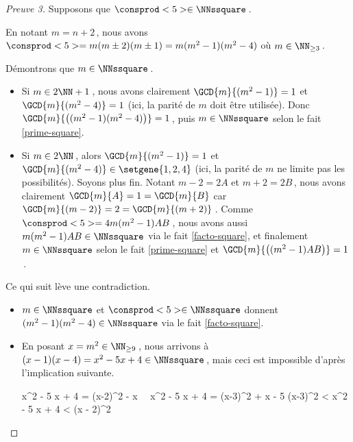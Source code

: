 \begin{proof}[Preuve 3]
	Supposons que $\consprod<5> \in \NNssquare$\,.
    
    \smallskip
    
	En notant $m = n+2$\,, nous avons $\consprod<5> = m (m \pm 2) (m \pm 1) = m (m^2 - 1) (m^2 - 4)$ où $m \in \NN_{\geq 3}$\,.
    
    \medskip
    
    Démontrons que $m \in \NNssquare$\,.
	\begin{itemize}
		\item Si $m \in 2 \NN + 1$\,, nous avons clairement $\GCD{m}{(m^2 - 1)} = 1$ et $\GCD{m}{(m^2 - 4)} = 1$ (ici, la parité de $m$ doit être utilisée).
		Donc $\GCD{m}{\big( (m^2 - 1) (m^2 - 4) \big)} = 1$\,, puis $m \in \NNssquare$ selon le fait \ref{prime-square}.

		\item Si $m \in 2 \NN$\,, alors $\GCD{m}{(m^2 - 1)} = 1$ et $\GCD{m}{(m^2 - 4)} \in \setgene{1, 2, 4}$ (ici, la parité de $m$ ne limite pas les possibilités). Soyons plus fin.
		Notant $m - 2 = 2A$ et $m + 2 = 2B$\,, nous avons clairement $\GCD{m}{A} = 1 = \GCD{m}{B}$ car $\GCD{m}{(m - 2)} = 2 = \GCD{m}{(m + 2)}$\,.
		Comme $\consprod<5> = 4 m (m^2 - 1) A B$\,, nous avons aussi $m (m^2 - 1) A B \in \NNssquare$ via le fait \ref{facto-square}, et finalement $m \in \NNssquare$ selon le fait \ref{prime-square} et $\GCD{m}{\big( (m^2 - 1) A B \big)} = 1$\,. 
	\end{itemize}
    
    \medskip
    
    Ce qui suit lève une contradiction.
	\begin{itemize}
		\item $m \in \NNssquare$ et $\consprod<5> \in \NNssquare$ donnent $(m^2 - 1) (m^2 - 4) \in \NNssquare$ via le fait \ref{facto-square}. 

		\item En posant $x = m^2 \in \NN_{\geq 9}$\,, nous arrivons à $(x - 1) (x - 4) = x^2 - 5 x + 4 \in \NNssquare$\,, mais ceci est impossible d'après l'implication suivante.
		
		\noindent\kern-10pt%
		\begin{stepcalc}[style=ar*, ope={\implies}]
			x^2 - 5 x + 4 = (x-2)^2 - x
			\,\,\,\,
			x^2 - 5 x + 4 = (x-3)^2 + x - 5
			(x-3)^2 < x^2 - 5 x + 4 < (x - 2)^2
		\end{stepcalc}
	\end{itemize}

    \vspace{-1.5ex}
    \qedhere
\end{proof}


